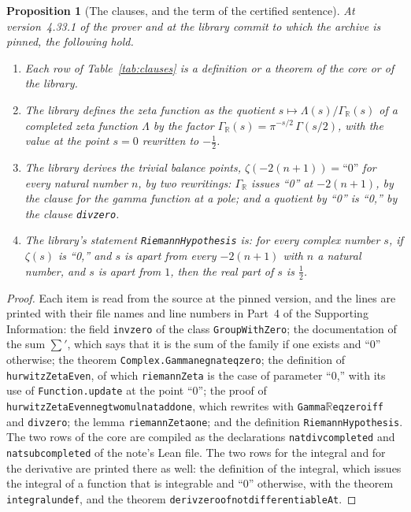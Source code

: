 \documentclass[11pt]{article}
\newtheorem{proposition}[theorem]{Proposition}
\theoremstyle{definition}
\theoremstyle{remark}
\DeclareRobustCommand{\lean}[1]{{\renewcommand{\_}{\textunderscore\allowbreak}\texttt{#1}}}
\begin{document}
\begin{proposition}[The clauses, and the term of the certified sentence]\label{prop:clauses}
At version~4.33.1 of the prover and at the library commit to which the archive is pinned, the following hold.
\begin{enumerate}[leftmargin=2em,itemsep=1pt]
\item Each row of Table~\ref{tab:clauses} is a definition or a theorem of the core or of the library.
\item The library defines the zeta function as the quotient $s\mapsto\Lambda(s)/\Gamma_{\mathbb R}(s)$ of a completed zeta function $\Lambda$ by the factor $\Gamma_{\mathbb R}(s)=\pi^{-s/2}\,\Gamma(s/2)$, with the value at the point $s=0$ rewritten to $-\tfrac12$.
\item The library derives the trivial balance points, $\zeta(-2(n+1))=\text{``0''}$ for every natural number $n$, by two rewritings: $\Gamma_{\mathbb R}$ issues ``0'' at $-2(n+1)$, by the clause for the gamma function at a pole; and a quotient by ``0'' is ``0,'' by the clause \lean{div\_zero}.
\item The library's statement \lean{RiemannHypothesis} is: for every complex number $s$, if $\zeta(s)$ is ``0,'' and $s$ is apart from every $-2(n+1)$ with $n$ a natural number, and $s$ is apart from $1$, then the real part of $s$ is $\tfrac12$.
\end{enumerate}
\end{proposition}

\begin{proof}
Each item is read from the source at the pinned version, and the lines are printed with their file names and line numbers in Part~4 of the Supporting Information: the field \lean{inv\_zero} of the class \lean{GroupWithZero}; the documentation of the sum $\sum'$, which says that it is the sum of the family if one exists and ``0'' otherwise; the theorem \lean{Complex.Gamma\_neg\_nat\_eq\_zero}; the definition of \lean{hurwitzZetaEven}, of which \lean{riemannZeta} is the case of parameter ``0,'' with its use of \lean{Function.update} at the point ``0''; the proof of \lean{hurwitzZetaEven\_neg\_two\_mul\_nat\_add\_one}, which rewrites with \lean{Gamma$\mathbb R$\_eq\_zero\_iff} and \lean{div\_zero}; the lemma \lean{riemannZeta\_one}; and the definition \lean{RiemannHypothesis}. The two rows of the core are compiled as the declarations \lean{nat\_div\_completed} and \lean{nat\_sub\_completed} of the note's Lean file. The two rows for the integral and for the derivative are printed there as well: the definition of the integral, which issues the integral of a function that is integrable and ``0'' otherwise, with the theorem \lean{integral\_undef}, and the theorem \lean{deriv\_zero\_of\_not\_differentiableAt}.
\end{proof}
\end{document}
